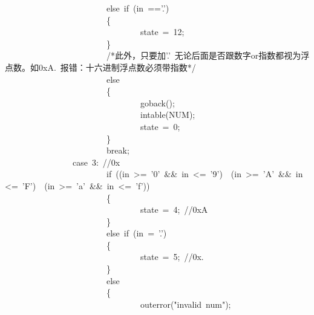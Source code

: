 \documentclass{article}
\begin{document}
\begin{mdpre}
~~~~~~~~~~~~~~~~~~~~~~~~{else}~{if}~(in~=={'.'})\\
~~~~~~~~~~~~~~~~~~~~~~~~\{\\
~~~~~~~~~~~~~~~~~~~~~~~~~~~~~~~~state~=~{12};\\
~~~~~~~~~~~~~~~~~~~~~~~~\}\\
~~~~~~~~~~~~~~~~~~~~~~~~{/*}{此外，只要加'.'~无论后面是否跟数字or指数都视为浮点数。如0xA.~报错：十六进制浮点数必须带指数}{*/}\\
~~~~~~~~~~~~~~~~~~~~~~~~{else}\\
~~~~~~~~~~~~~~~~~~~~~~~~\{\\
~~~~~~~~~~~~~~~~~~~~~~~~~~~~~~~~goback();\\
~~~~~~~~~~~~~~~~~~~~~~~~~~~~~~~~intable({NUM});\\
~~~~~~~~~~~~~~~~~~~~~~~~~~~~~~~~state~=~{0};\\
~~~~~~~~~~~~~~~~~~~~~~~~\}\\
~~~~~~~~~~~~~~~~~~~~~~~~{break};\\
~~~~~~~~~~~~~~~~{case}~{3}:~{//0x}\\
~~~~~~~~~~~~~~~~~~~~~~~~{if}~((in~\textgreater{}=~{'0'}~\&\&~in~\textless{}=~{'9'})~\textbar{}\textbar{}~(in~\textgreater{}=~{'A'}~\&\&~in~\textless{}=~{'F'})~\textbar{}\textbar{}~(in~\textgreater{}=~{'a'}~\&\&~in~\textless{}=~{'f'}))\\
~~~~~~~~~~~~~~~~~~~~~~~~\{\\
~~~~~~~~~~~~~~~~~~~~~~~~~~~~~~~~state~=~{4};~{//0xA}\\
~~~~~~~~~~~~~~~~~~~~~~~~\}\\
~~~~~~~~~~~~~~~~~~~~~~~~{else}~{if}~(in~=~{'.'})\\
~~~~~~~~~~~~~~~~~~~~~~~~\{\\
~~~~~~~~~~~~~~~~~~~~~~~~~~~~~~~~state~=~{5};~{//0x.}\\
~~~~~~~~~~~~~~~~~~~~~~~~\}\\
~~~~~~~~~~~~~~~~~~~~~~~~{else}\\
~~~~~~~~~~~~~~~~~~~~~~~~\{\\
~~~~~~~~~~~~~~~~~~~~~~~~~~~~~~~~outerror({"}{invalid~num}{"});\\

\end{mdpre}
\end{document}
